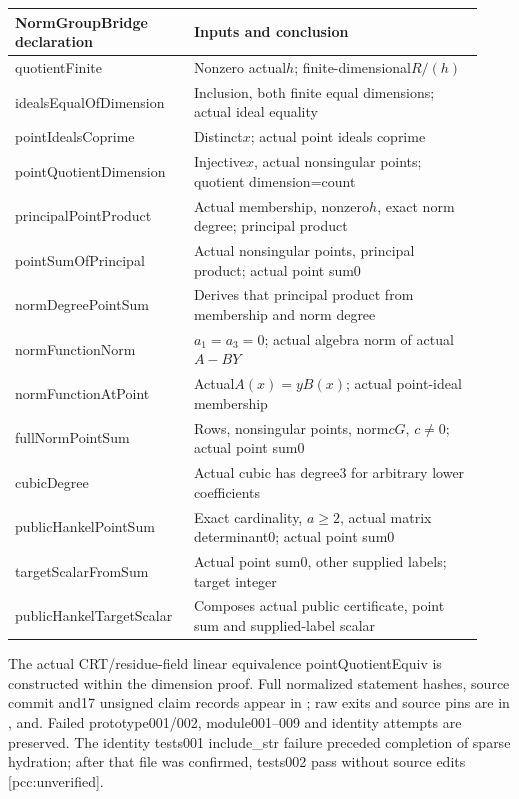 \documentclass[11pt]{article}
\begin{document}
\begin{center}\footnotesize
\begin{tabular}{p{0.34\linewidth}p{0.59\linewidth}}
NormGroupBridge declaration & Inputs and conclusion\\\hline
quotientFinite & Nonzero actual$h$; finite-dimensional$R/(h)$\\
idealsEqualOfDimension & Inclusion, both finite equal dimensions; actual ideal equality\\
pointIdealsCoprime & Distinct$x$; actual point ideals coprime\\
pointQuotientDimension & Injective$x$, actual nonsingular points; quotient dimension=count\\
principalPointProduct & Actual membership, nonzero$h$, exact norm degree; principal product\\
pointSumOfPrincipal & Actual nonsingular points, principal product; actual point sum0\\
normDegreePointSum & Derives that principal product from membership and norm degree\\
normFunctionNorm & $a_1=a_3=0$; actual algebra norm of actual$A-BY$\\
normFunctionAtPoint & Actual$A(x)=yB(x)$; actual point-ideal membership\\
fullNormPointSum & Rows, nonsingular points, norm$cG$, $c\ne0$; actual point sum0\\
cubicDegree & Actual cubic has degree3 for arbitrary lower coefficients\\
publicHankelPointSum & Exact cardinality, $a\ge2$, actual matrix determinant0; actual point sum0\\
targetScalarFromSum & Actual point sum0, other supplied labels; target integer\\
publicHankelTargetScalar & Composes actual public certificate, point sum and supplied-label scalar
\end{tabular}
\end{center}
The actual CRT/residue-field linear equivalence pointQuotientEquiv is
constructed within the dimension proof. Full normalized statement hashes,
source commit and17 unsigned claim records appear in
; raw exits and source pins are in
,  and.
Failed prototype001/002, module001--009 and identity attempts are preserved.
The identity tests001 include\_str failure preceded completion of sparse
hydration; after that file was confirmed, tests002 pass without source edits
[pcc:unverified].
\end{document}
